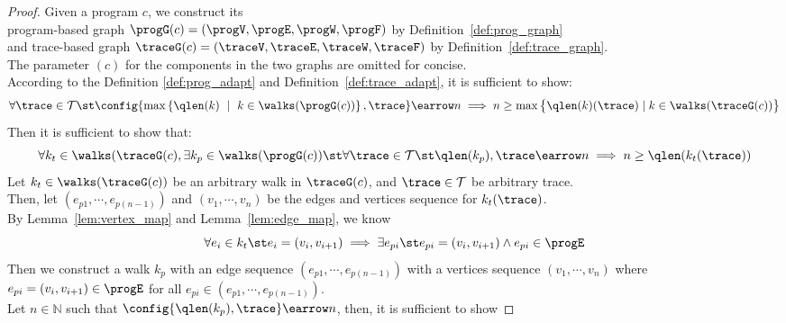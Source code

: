 \begin{proof}
Given a program ${c}$, 
we construct its 
\\
program-based graph $\progG({c}) = (\progV, \progE, \progW, \progF)$
by Definition~\ref{def:prog_graph}
\\ and 
trace-based graph $\traceG({c}) = (\traceV, \traceE, \traceW, \traceF)$  by Definition~\ref{def:trace_graph}.
\\
The parameter $(c)$ for the components in the two graphs are omitted for concise.
\\
%
According to the Definition \ref{def:prog_adapt} and Definition~\ref{def:trace_adapt}, it is sufficient to show:
%
$$
\forall \trace \in \mathcal{T} \st
\config{\max\left\{ \qlen(k) \ \mid \  k\in \walks(\progG({c}))\right \}
, \trace } \earrow n \implies
n \geq
\max \big 
\{ \qlen(k)(\trace) \mid k \in \walks(\traceG(c)) \big \} 
$$
%
%
Then it is sufficient to show that:
\[
  \forall 
  k_t \in \walks(\traceG({c}),
  \exists k_p \in \walks(\progG({c})) 
  \st \forall \trace \in \mathcal{T} \st
  \qlen(k_p), \trace \earrow n
   \implies 
  n \geq \qlen(k_t(\trace))
\]
%
Let $k_t\in \walks(\traceG(c))$ be an arbitrary walk in $\traceG(c)$, 
and $\trace \in \mathcal{T}$ be arbitrary trace.
\\
Then, 
let $(e_{p1}, \cdots, e_{p(n-1)}) $ and
$(v_1, \cdots, v_n)$ be the edges and vertices sequence  for $k_t(\trace)$.
\\
%
%
By Lemma~\ref{lem:vertex_map} and Lemma~\ref{lem:edge_map}, we know
%
\[
  \forall e_i \in k_t \st e_i = (v_i, v_{i + 1}) \implies
  \exists e_{pi} \st e_{pi} = (v_i, v_{i + 1}) \land e_{pi} \in \progE
  \]
Then we construct a walk $k_p$ with an edge sequence $(e_{p1}, \cdots, e_{p(n-1)}) $ 
with a vertices sequence $(v_1, \cdots, v_n)$ where 
$e_{pi} = (v_i, v_{i + 1}) \in \progE$ for all $e_{pi} \in (e_{p1}, \cdots, e_{p(n-1)})$.
\\
Let $n \in \mathbb{N}$ such that 
$\config{\qlen(k_p), \trace} \earrow n$,
then, it is sufficient to show

\end{proof}
